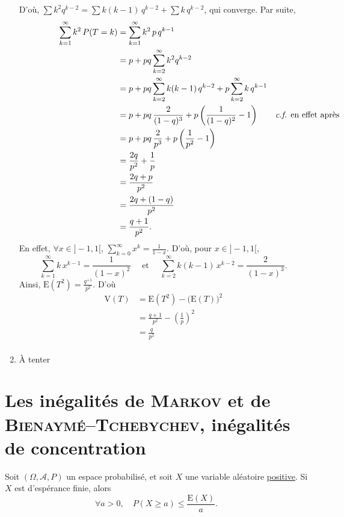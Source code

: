 \begin{exo}
\begin{enumerate}
      D'où,  $\sum k^2 q^{k-2} = \sum k(k-1)\, q^{k-2} + \sum k\,q^{k-2}$, qui converge. Par suite,
      \begin{align*}
        \sum_{k=1}^\infty k^2\, P(T = k) &= \sum_{k=1}^\infty k^2\,p\,q^{k-1}\\
        &= p + pq \sum_{k=2}^\infty k^2 q^{k-2} \\
        &= p + pq \sum_{k=2}^\infty k(k-1)\,q^{k-2} + p\sum_{k=2}^\infty k\,q^{k-1} \\
        &= p + pq\, \frac{2}{(1-q)^3} + p\left(\frac{1}{(1-q)^2} - 1 \right) \rlap{\quad\quad \text{\textit{c.f.} en effet après}}\\
        &= p + pq\, \frac{2}{p^3} + p\left( \frac{1}{p^2} - 1 \right) \\
        &= \frac{2q}{p^2} + \frac{1}{p} \\
        &= \frac{2q + p}{p^2} \\
        &= \frac{2q + (1-q)}{p^2} \\
        &= \frac{q+1}{p^2}. \\
      \end{align*}
      En effet, $\forall x \in {]-1,1[}$, $\sum_{k=0}^\infty x^k = \frac{1}{1-x}$. D'où, pour $x \in {]-1,1[}$, \[
        \sum_{k=1}^\infty k\,x^{k-1} = \frac{1}{(1-x)^2}
        \quad \text{ et }\quad
        \sum_{k=2}^\infty k(k-1)\,x^{k-2} = \frac{2}{(1-x)^3}
      .\]
      Ainsi, $\mathrm{E}(T^2) = \frac{q^{+1}}{p^2}$. D'où
      \begin{align*}
        \mathrm{V}(T) &= \mathrm{E}(T^2) - \big(\mathrm{E}(T)\big)^2 \\
        &= \frac{q+1}{p^2} - \left( \frac{1}{p} \right)^2 \\
        &= \frac{q}{p^2} \\
      \end{align*}
    \item À tenter
  \end{enumerate}
\end{exo}


\section{Les inégalités de \textsc{Markov} et de \textsc{Bienaymé}--\textsc{Tchebychev}, inégalités de concentration}

\begin{lem}[Markov]
  Soit $(\Omega, \mathcal{A}, P)$\/ un espace probabilisé, et soit $X$\/ une variable aléatoire \underline{positive}.
  Si $X$\/ est d'espérance finie, alors \[
    \forall a > 0, \quad P(X \ge a) \le \frac{\mathrm{E}(X)}{a}
  .\]
\end{lem}

